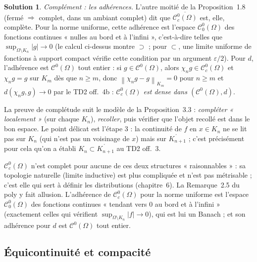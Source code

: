 \documentclass[11pt,a4paper]{article}
\newcommand{\interieur}[1]{\mathring{#1}}
\newcommand{\adh}[1]{\overline{#1}}
\newcommand{\norm}[1]{\left\|#1\right\|}
\newcommand{\Cz}{\mathcal{C}^0}
\newcommand{\Cc}{\mathcal{C}^0_c}
\newcommand{\ie}{c'est-à-dire}
\theoremstyle{definition}
\newtheorem*{solution}{Solution}
\begin{document}
\begin{solution}
\emph{Complément : les adhérences.} L'autre moitié de la Proposition~1.8 (fermé $\Rightarrow$ complet, dans un ambiant complet) dit que $\adh{\Cc(\Omega)}$ est, elle, complète. Pour la norme uniforme, cette adhérence est l'espace $\Cz_0(\Omega)$ des fonctions continues « nulles au bord et à l'infini », \ie{} telles que $\sup_{\Omega\setminus K_n}|g|\to0$ (le calcul ci-dessus montre $\supset$ ; pour $\subset$, une limite uniforme de fonctions à support compact vérifie cette condition par un argument $\varepsilon/2$). Pour $d$, l'adhérence est $\Cz(\Omega)$ tout entier : si $g\in\Cz(\Omega)$, alors $\chi_ng\in\Cc(\Omega)$ et $\chi_ng=g$ sur $K_m$ dès que $n\ge m$, donc $\norm{\chi_ng-g}_{K_m}=0$ pour $n\ge m$ et $d(\chi_ng,g)\to0$ par le TD2 off.~4b : \emph{$\Cc(\Omega)$ est dense dans $(\Cz(\Omega),d)$}.
\end{solution}

\begin{pointcle}
La preuve de complétude suit le modèle de la Proposition~3.3 : \emph{compléter « localement »} (sur chaque $K_n$), \emph{recoller}, puis vérifier que l'objet recollé est dans le bon espace. Le point délicat est l'étape 3 : la continuité de $f$ en $x\in K_n$ ne se lit pas sur $K_n$ (qui n'est pas un voisinage de $x$) mais sur $\interieur{K_{n+1}}$ ; c'est précisément pour cela qu'on a établi $K_n\subset\interieur{K_{n+1}}$ au TD2 off.~3.
\end{pointcle}

\begin{commentaire}
$\Cc(\Omega)$ n'est complet pour aucune de ces deux structures « raisonnables » : sa topologie naturelle (limite inductive) est plus compliquée et n'est pas métrisable ; c'est elle qui sert à définir les distributions (chapitre~6). La Remarque~2.5 du poly y fait allusion. L'adhérence de $\Cc(\Omega)$ pour la norme uniforme est l'espace $\Cz_0(\Omega)$ des fonctions continues « tendant vers $0$ au bord et à l'infini » (exactement celles qui vérifient $\sup_{\Omega\setminus K_n}|f|\to0$), qui est lui un Banach ; et son adhérence pour $d$ est $\Cz(\Omega)$ tout entier.
\end{commentaire}

\subsection*{Équicontinuité et compacité}
\end{document}
